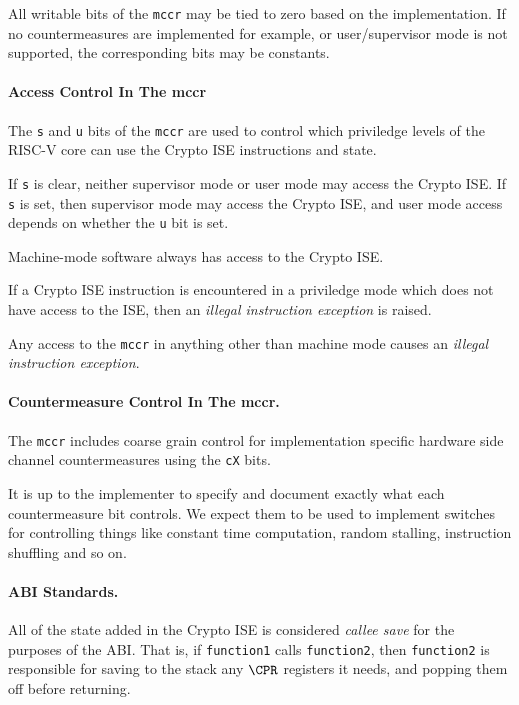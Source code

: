 All writable bits of the {\tt mccr} may be tied to zero based on the
implementation. If no countermeasures are implemented for example, or
user/supervisor mode is not supported, the corresponding bits may be
constants.

\paragraph{Access Control In The mccr}

The {\tt s} and {\tt u} bits of the {\tt mccr} are used to control which
priviledge levels of the RISC-V core can use the Crypto ISE instructions
and state. 

If {\tt s} is clear, neither supervisor mode or user mode may access the
Crypto ISE. If {\tt s} is set, then supervisor mode may access the Crypto
ISE, and user mode access depends on whether the {\tt u} bit is set.

Machine-mode software always has access to the Crypto ISE.

If a Crypto ISE instruction is encountered in a priviledge mode which
does not have access to the ISE, then an {\em illegal instruction exception}
is raised.

Any access to the {\tt mccr} in anything other than machine mode
causes an {\em illegal instruction exception}.

\paragraph{Countermeasure Control In The mccr.}

The {\tt mccr} includes coarse grain control for implementation specific
hardware side channel countermeasures using the {\tt cX} bits.

It is up to the implementer to specify and document exactly what each
countermeasure bit controls. We expect them to be used to implement
switches for controlling things like constant time computation, random
stalling, instruction shuffling and so on.

\paragraph{ABI Standards.}

All of the state added in the Crypto ISE is considered {\em callee save}
for the purposes of the ABI.
That is, if {\tt function1} calls 
{\tt function2}, then {\tt function2} is responsible for saving to the
stack any $\CPR$ registers it needs, and popping them off before returning.

